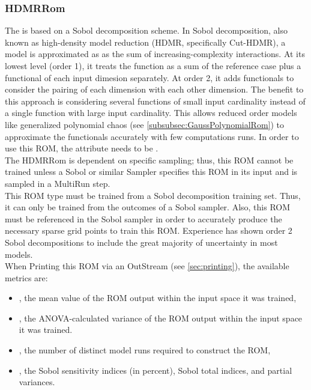 \subsubsection{HDMRRom}
  The  is based on a Sobol decomposition scheme.                         In Sobol
  decomposition, also known as high-density model reduction (HDMR, specifically Cut-HDMR),
  a model is approximated as as the sum of increasing-complexity interactions.  At its lowest level
  (order 1), it treats the function as a sum of the reference case plus a functional of each input
  dimesion separately.  At order 2, it adds functionals to consider the pairing of each dimension
  with each other dimension.  The benefit to this approach is considering several functions of small
  input cardinality instead of a single function with large input cardinality.  This allows reduced
  order models like generalized polynomial chaos (see \ref{subsubsec:GaussPolynomialRom}) to
  approximate the functionals accurately with few computations runs.                         In
  order to use this ROM, the  attribute  needs to
  be .                         \\                         The HDMRRom is
  dependent on specific sampling; thus, this ROM cannot be trained unless a
  Sobol or similar Sampler specifies this ROM in its input and is sampled in a MultiRun step.
  \\                         \nb This ROM type must be trained from a Sobol decomposition training
  set.                         Thus, it can only be trained from the outcomes of a Sobol sampler.
  Also, this ROM must be referenced in the Sobol sampler in order to
  accurately produce the necessary sparse grid points to train this ROM.
  Experience has shown order 2 Sobol decompositions to include the great majority of
  uncertainty in most models.                         
  \\                         When Printing this ROM via an OutStream (see \ref{sec:printing}), the
  available metrics are:                         \begin{itemize}                           \item
  , the mean value of the ROM output within the input space it was trained,
  \item {}, the ANOVA-calculated variance of the ROM output within the input space
  it                             was trained.                           \item {},
  the number of distinct model runs required to construct the ROM,                           \item
  , the Sobol sensitivity indices (in percent), Sobol total indices, and partial
  variances.                         \end{itemize}

